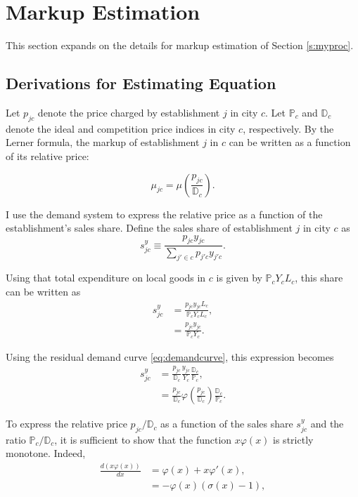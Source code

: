 \newpage
\section{Markup Estimation}

This section expands on the details for markup estimation of Section \ref{s:myproc}.

\subsection{Derivations for Estimating Equation}\label{a:muestderiv}
Let $p_{jc}$ denote the price charged by establishment $j$ in city $c$. Let $\mathbb{P}_c$ and $\mathbb{D}_c$ denote the ideal and competition price indices in city $c$, respectively. By the Lerner formula, the markup of establishment $j$ in $c$ can be written as a function of its relative price:

\begin{equation*}
	\mu_{jc} = \mu\left(\frac{p_{jc}}{\mathbb{D}_c}\right).
\end{equation*}

I use the demand system to express the relative price as a function of the establishment’s sales share. Define the sales share of establishment $j$ in city $c$ as
\begin{equation*}
	s^y_{jc} \equiv \frac{p_{jc}y_{jc}}{\sum_{j' \in c} p_{j'c}y_{j'c}}.
\end{equation*}

Using that total expenditure on local goods in $c$ is given by $\mathbb{P}_c Y_c L_c$, this share can be written as
\begin{align*}
	s^y_{jc} &= \frac{p_{jc} y_{jc} L_c}{\mathbb{P}_c Y_c L_c}, \\
	         &= \frac{p_{jc} y_{jc}}{\mathbb{P}_c Y_c}.
\end{align*}

Using the residual demand curve \eqref{eq:demandcurve}, this expression becomes
\begin{align*}
	s^y_{jc} &= \frac{p_{jc}}{\mathbb{D}_c} \frac{y_{jc}}{Y_c} \frac{\mathbb{D}_c}{\mathbb{P}_c}, \\
	         &= \frac{p_{jc}}{\mathbb{D}_c} \varphi\left(\frac{p_{jc}}{\mathbb{D}_c}\right) \frac{\mathbb{D}_c}{\mathbb{P}_c}.
\end{align*}

To express the relative price $p_{jc}/\mathbb{D}_c$ as a function of the sales share $s^y_{jc}$ and the ratio $\mathbb{P}_c/\mathbb{D}_c$, it is sufficient to show that the function $x\varphi(x)$ is strictly monotone. Indeed,
\begin{align*}
	\frac{d \left(x\varphi(x)\right)}{d x} &= \varphi(x) + x \varphi'(x), \\
	                                        &= - \varphi(x)\left(\sigma(x) - 1\right),
\end{align*}

